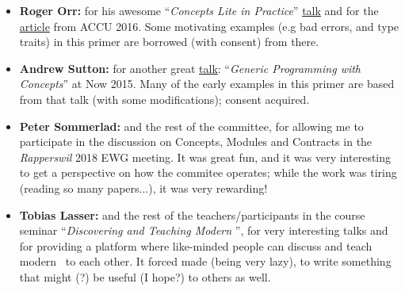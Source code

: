\begin{itemize}
    \item{\textbf{Roger Orr:} for his awesome ``\emph{Concepts Lite in Practice}'' \href{https://www.youtube.com/watch?v=S1Z-RbygAlw}{talk} and for the \href{https://accu.org/index.php/journals/2246}{article} from ACCU 2016. Some motivating examples (e.g bad errors, and type traits) in this primer are borrowed (with consent) from there.}
    \item{\textbf{Andrew Sutton:} for another great \href{https://www.youtube.com/watch?v=_rBhX-FJCdg}{talk}: ``\emph{Generic Programming with Concepts}'' at \Cpp Now 2015. Many of the early examples in this primer are based from that talk (with some modifications); consent acquired.}
    \item{\textbf{Peter Sommerlad:} and the rest of the committee, for allowing me to participate in the discussion on Concepts, Modules and Contracts in the \emph{Rapperswil} 2018 EWG meeting. It was great fun, and it was very interesting to get a perspective on how the commitee operates; while the work was tiring (reading so many papers...), it was very rewarding!}
    \item{\textbf{Tobias Lasser:} and the rest of the teachers/participants in the course seminar ``\emph{Discovering and Teaching Modern \Cpp}'', for very interesting talks and for providing a platform where like-minded people can discuss and teach modern \Cpp\ to each other. It forced made (being very lazy), to write something that might (?) be useful (I hope?) to others as well.}
\end{itemize}
